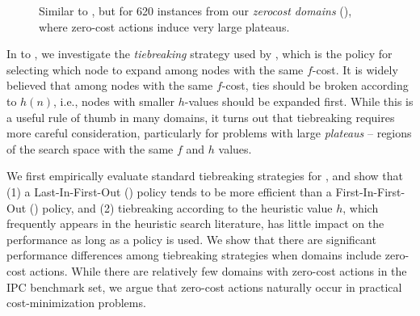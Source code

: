 \begin{figure}[htb]
\begin{minipage}[t]{0.26\textwidth}
  \caption{Similar to , but for 620 instances from our 
  \emph{zerocost domains} (),
  where zero-cost actions induce very large plateaus.
 }
 \label{fig:plateau-zerocost}
 \end{minipage}
\end{figure}


In  to , we investigate the \emph{tiebreaking} strategy used by
\astar, which is the policy for selecting which node to expand among nodes with the same $f$-cost.
It is widely believed that among nodes with the same $f$-cost, %
ties should be broken according to $h(n)$, i.e.,
nodes with smaller $h$-values should be expanded first.  While this is a
useful rule of thumb in many domains, it turns out that tiebreaking
requires more careful consideration, particularly for problems with
large \emph{plateaus} -- regions of the search space with the same $f$ and $h$ values.

We first empirically evaluate standard tiebreaking strategies for \astar, and show that 
% 
(1) a Last-In-First-Out (\lifo) policy tends to be more efficient than a First-In-First-Out (\fifo) policy, and 
% 
(2) tiebreaking according to the heuristic value $h$, which
frequently appears in the heuristic search literature, has little 
impact on the performance as long as a \lifo policy is used.
% 
We show that there are significant performance differences among tiebreaking strategies
when domains include zero-cost actions.
While there are relatively few domains with zero-cost actions in the
IPC benchmark set, we argue that zero-cost actions naturally occur in 
practical cost-minimization problems.



